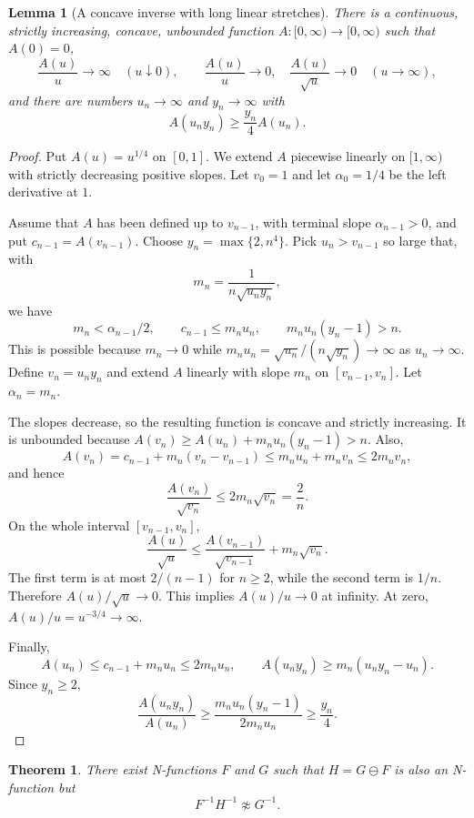 \documentclass[11pt]{article}
\newtheorem{theorem}{Theorem}
\newtheorem{lemma}{Lemma}
\newcommand{\om}{\ominus}
\begin{document}
\begin{lemma}[A concave inverse with long linear stretches]\label{lem:A}
There is a continuous, strictly increasing, concave, unbounded function
$A:[0,\infty)\to[0,\infty)$ such that $A(0)=0$,
\[
  \frac{A(u)}{u}\to\infty\quad(u\downarrow0),\qquad
  \frac{A(u)}{u}\to0,\quad
  \frac{A(u)}{\sqrt u}\to0\quad(u\to\infty),
\]
and there are numbers $u_n\to\infty$ and $y_n\to\infty$ with
\[
  A(u_ny_n)\geq \frac{y_n}{4}A(u_n).
\]
\end{lemma}

\begin{proof}
Put $A(u)=u^{1/4}$ on $[0,1]$. We extend $A$ piecewise linearly on
$[1,\infty)$ with strictly decreasing positive slopes. Let $v_0=1$ and let
$\alpha_0=1/4$ be the left derivative at $1$.

Assume that $A$ has been defined up to $v_{n-1}$, with terminal slope
$\alpha_{n-1}>0$, and put $c_{n-1}=A(v_{n-1})$. Choose
$y_n=\max\{2,n^4\}$. Pick $u_n>v_{n-1}$ so large that, with
\[
  m_n=\frac{1}{n\sqrt{u_ny_n}},
\]
we have
\[
  m_n<\alpha_{n-1}/2,\qquad
  c_{n-1}\leq m_nu_n,\qquad
  m_nu_n(y_n-1)>n.
\]
This is possible because $m_n\to0$ while
$m_nu_n=\sqrt{u_n}/(n\sqrt{y_n})\to\infty$ as $u_n\to\infty$. Define
$v_n=u_ny_n$ and extend $A$ linearly with slope $m_n$ on $[v_{n-1},v_n]$.
Let $\alpha_n=m_n$.

The slopes decrease, so the resulting function is concave and strictly
increasing. It is unbounded because
$A(v_n)\geq A(u_n)+m_nu_n(y_n-1)>n$. Also,
\[
  A(v_n)=c_{n-1}+m_n(v_n-v_{n-1})
  \leq m_nu_n+m_nv_n\leq 2m_nv_n,
\]
and hence
\[
  \frac{A(v_n)}{\sqrt{v_n}}\leq 2m_n\sqrt{v_n}=\frac{2}{n}.
\]
On the whole interval $[v_{n-1},v_n]$,
\[
  \frac{A(u)}{\sqrt u}
  \leq \frac{A(v_{n-1})}{\sqrt{v_{n-1}}}+m_n\sqrt{v_n}.
\]
The first term is at most $2/(n-1)$ for $n\geq2$, while the second term is
$1/n$. Therefore $A(u)/\sqrt u\to0$. This implies $A(u)/u\to0$ at infinity.
At zero, $A(u)/u=u^{-3/4}\to\infty$.

Finally,
\[
  A(u_n)\leq c_{n-1}+m_nu_n\leq 2m_nu_n,\qquad
  A(u_ny_n)\geq m_n(u_ny_n-u_n).
\]
Since $y_n\geq2$,
\[
  \frac{A(u_ny_n)}{A(u_n)}
  \geq \frac{m_nu_n(y_n-1)}{2m_nu_n}
  \geq \frac{y_n}{4}.
\]
\end{proof}

\begin{theorem}
There exist N-functions $F$ and $G$ such that $H=G\om F$ is also an N-function
but
\[
  F^{-1}H^{-1}\not\approx G^{-1}.
\]
\end{theorem}
\end{document}
